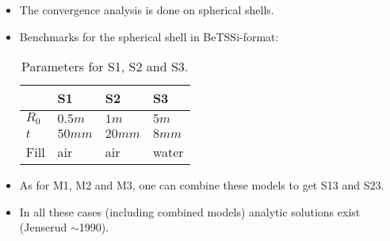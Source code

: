 \begin{itemize}
\item The convergence analysis is done on spherical shells.
\item Benchmarks for the spherical shell in BeTSSi-format: %
\begin{table}
	\centering%
	\begin{tabular}{l l l l}
		\toprule
		 & S1 & S2 & S3 \\
		\midrule
		$R_0$ & $0.5\unit{m}$ & $1\unit{m}$ & $5\unit{m}$\\
		$t$ & $50\unit{mm}$ & $20\unit{mm}$ & $8\unit{mm}$\\
		Fill & air & air & water\\
		\bottomrule
	\end{tabular}
	\caption{Parameters for S1, S2 and S3.}%
\end{table}
\item As for M1, M2 and M3, one can combine these models to get S13 and S23.
\item In all these cases (including combined models) analytic solutions exist (Jenserud $\sim$1990).
\end{itemize}%
